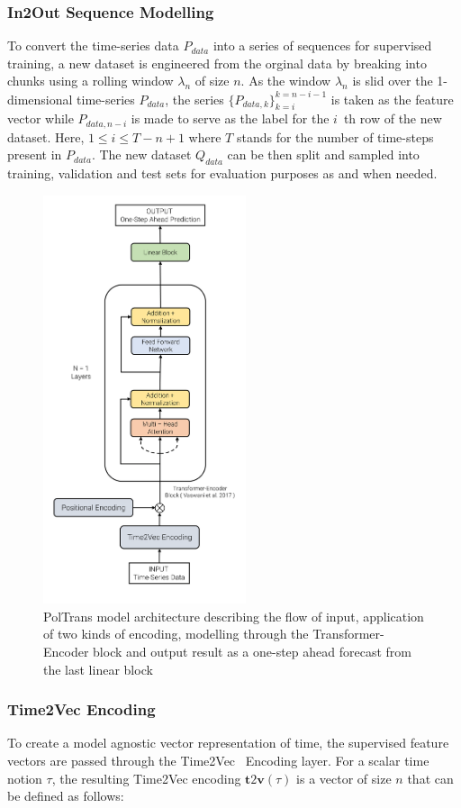 \documentclass[10pt,journal]{IEEEtran}
\begin{document}
\subsubsection{In2Out Sequence Modelling}
To convert the time-series data ${P_{data}}$ into a series of sequences for supervised training, a new dataset is engineered from the orginal data by breaking into chunks using a rolling window ${\lambda_n}$ of size ${n}$. As the window ${\lambda_n}$ is slid over the 1-dimensional time-series ${P_{data}}$, the series $\{{P_{data, k}}\}^{k=n-i-1}_{k=i}$ is taken as the feature vector while ${P_{data, n-i}}$ is made to serve as the label for the ${i}$~th row of the new dataset. Here, ${1 \leq i \leq {T - n + 1}}$ where ${T}$ stands for the number of time-steps present in ${P_{data}}$. The new dataset ${Q_{data}}$ can be then split and sampled into training, validation and test sets for evaluation purposes as and when needed.

\begin{figure}[h]
\centering
\includegraphics[height=12cm]{../paper_figures/model-architecture.png}
\caption{{PolTrans}  model architecture describing the flow of input, application of two kinds of encoding, modelling through the Transformer-Encoder block and output result as a one-step ahead forecast from the last linear block}
\label{fig:model-archi}
\end{figure}

\subsubsection{Time2Vec Encoding}
To create a model agnostic vector representation of time, the supervised feature vectors are passed through the Time2Vec~\cite{Kazemi.2019} Encoding layer.  For a scalar time notion ${\tau}$, the resulting Time2Vec encoding ${\mathbf{t} 2 \mathbf{v}(\tau)}$ is a vector of size ${n}$ that can be defined as follows: 
\end{document}
